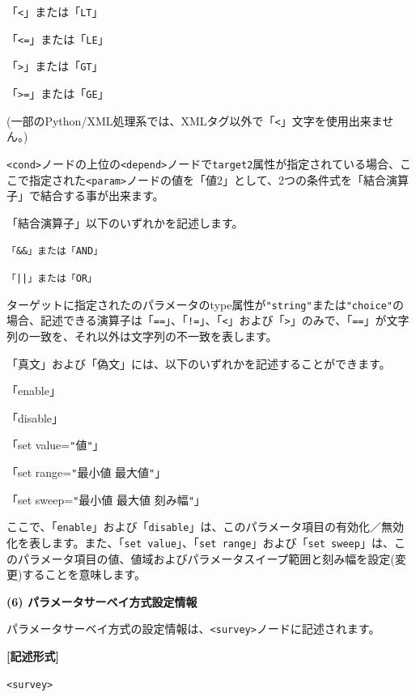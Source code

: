 \documentclass[a4paper,11pt]{jarticle}
\begin{document}
{「\texttt{<}」または「{\tt LT}」

「\texttt{<=}」または「{\tt LE}」

「\texttt{>}」または「{\tt GT}」

「\texttt{>=}」または「{\tt GE}」

\leftskip=0pt
(一部のPython/XML処理系では、XMLタグ以外で「\texttt{<}」文字を使用出来ません。)

\medskip
\texttt{<cond>}ノードの上位の\texttt{<depend>}ノードで\texttt{target2}属性が指定されている場合、ここで指定された\texttt{<param>}ノードの値を「値2」として、2つの条件式を「結合演算子」で結合する事が出来ます。

「結合演算子」以下のいずれかを記述します。

\leftskip=10pt
{\tt 「\&\&」または「AND」}

{\tt 「||」または「OR」}


\vspace{12pt}

ターゲットに指定されたのパラメータのtype属性が\texttt{"string"}または\texttt{"choice"}の場合、記述できる演算子は「\texttt{==}」、「\texttt{!=}」、「\texttt{<}」および「\texttt{>}」のみで、「\texttt{==}」が文字列の一致を、それ以外は文字列の不一致を表します。

「真文」および「偽文」には、以下のいずれかを記述することができます。

\leftskip=10pt
\begin{tt}
「enable」

「disable」

「set value=\texttt{"}値\texttt{"}」

「set range=\texttt{"}最小値  最大値\texttt{"}」

「set sweep=\texttt{"}最小値  最大値  刻み幅\texttt{"}」
\end{tt}
\leftskip=0pt
ここで、「{\tt enable}」および「{\tt disable}」は、このパラメータ項目の有効化／無効化を表します。また、「{\tt set value}」、「{\tt set range}」および「{\tt set sweep}」は、このパラメータ項目の値、値域およびパラメータスイープ範囲と刻み幅を設定(変更)することを意味します。

\vspace{12pt}
\textbf{(6) パラメータサーベイ方式設定情報}

パラメータサーベイ方式の設定情報は、\texttt{<survey>}ノードに記述されます。

\vspace{8pt}
\leftskip=12pt
\textbf{[記述形式]}

\leftskip=42pt
\texttt{<survey>}    

}
\end{document}
